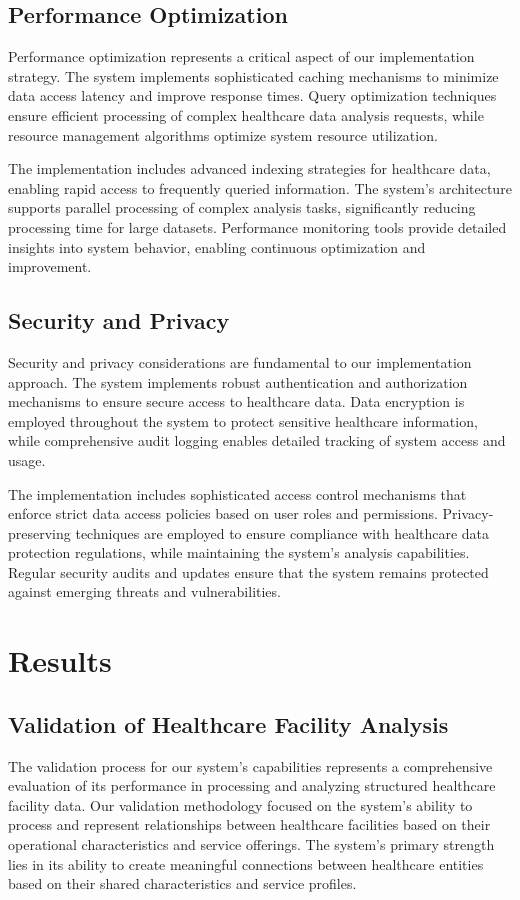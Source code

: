 \documentclass[12pt,a4paper]{report}
\begin{document}
\section{Performance Optimization}
Performance optimization represents a critical aspect of our implementation strategy. The system implements sophisticated caching mechanisms to minimize data access latency and improve response times. Query optimization techniques ensure efficient processing of complex healthcare data analysis requests, while resource management algorithms optimize system resource utilization.

The implementation includes advanced indexing strategies for healthcare data, enabling rapid access to frequently queried information. The system's architecture supports parallel processing of complex analysis tasks, significantly reducing processing time for large datasets. Performance monitoring tools provide detailed insights into system behavior, enabling continuous optimization and improvement.

\section{Security and Privacy}
Security and privacy considerations are fundamental to our implementation approach. The system implements robust authentication and authorization mechanisms to ensure secure access to healthcare data. Data encryption is employed throughout the system to protect sensitive healthcare information, while comprehensive audit logging enables detailed tracking of system access and usage.

The implementation includes sophisticated access control mechanisms that enforce strict data access policies based on user roles and permissions. Privacy-preserving techniques are employed to ensure compliance with healthcare data protection regulations, while maintaining the system's analysis capabilities. Regular security audits and updates ensure that the system remains protected against emerging threats and vulnerabilities.

\chapter{Results}
\section{Validation of Healthcare Facility Analysis}
The validation process for our system's capabilities represents a comprehensive evaluation of its performance in processing and analyzing structured healthcare facility data. Our validation methodology focused on the system's ability to process and represent relationships between healthcare facilities based on their operational characteristics and service offerings. The system's primary strength lies in its ability to create meaningful connections between healthcare entities based on their shared characteristics and service profiles.
\end{document}
